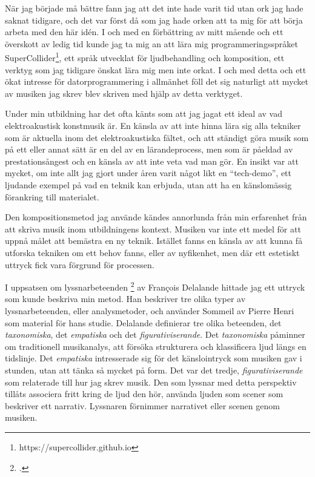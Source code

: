 \documentclass{article}
\begin{document}
När jag började må bättre fann jag att det inte hade varit tid utan ork jag hade saknat tidigare, och det var
först då som jag hade orken att ta mig för att börja arbeta med den här idén. I och med en förbättring av
mitt mående och ett överskott av ledig tid kunde jag ta mig an att lära mig programmeringsspråket 
SuperCollider\footnote{https://supercollider.github.io}, ett språk utvecklat för ljudbehandling och
komposition, ett verktyg som jag tidigare önskat lära mig men inte orkat. I och med detta och ett ökat
intresse för datorprogrammering i allmänhet föll det sig naturligt att mycket av musiken jag skrev blev
skriven med hjälp av detta verktyget.

Under min utbildning har det ofta känts som att jag jagat ett ideal av vad elektroakustisk konstmusik är. En
känsla av att inte hinna lära sig alla tekniker som är aktuella inom det elektroakustiska fältet, och att
ständigt göra musik som på ett eller annat sätt är en del av en lärandeprocess, men som är påeldad av
prestationsångest och en känsla av att inte veta vad man gör. En insikt var att mycket, om inte allt jag gjort
under åren varit något likt en ``tech-demo'', ett ljudande exempel på vad en teknik kan erbjuda, utan att ha en
känslomässig förankring till materialet.

Den kompositionsmetod jag använde kändes annorlunda från min erfarenhet från att skriva musik inom
utbildningens kontext. Musiken var inte ett medel för att uppnå målet att bemästra en ny teknik. Istället
fanns en känsla av att kunna få utforska tekniken om ett behov fanns, eller av nyfikenhet, men där ett
estetiskt uttryck fick vara förgrund för processen. 

I uppsatsen om lyssnarbeteenden \footcite{Delalande1998} av François Delalande hittade jag ett uttryck som kunde beskriva min metod. Han
beskriver tre olika typer av lyssnarbeteenden, eller analysmetoder, och använder Sommeil av Pierre Henri som
material för hans studie. Delalande definierar tre olika beteenden, det \emph{taxonomiska}, det
\emph{empatiska} och det \emph{figurativiserande}. Det \emph{taxonomiska} påminner om traditionell
musikanalys, att försöka strukturera och klassificera ljud längs en tidslinje. Det \emph{empatiska}
intresserade sig för det känslointryck som musiken gav i stunden, utan att tänka så mycket på form. Det var
det tredje, \emph{figurativiserande} som relaterade till hur jag skrev musik. Den som lyssnar med detta
perspektiv tillåts associera fritt kring de ljud den hör, använda ljuden som scener som beskriver ett
narrativ. Lyssnaren förnimmer narrativet eller scenen genom musiken. 
\end{document}
